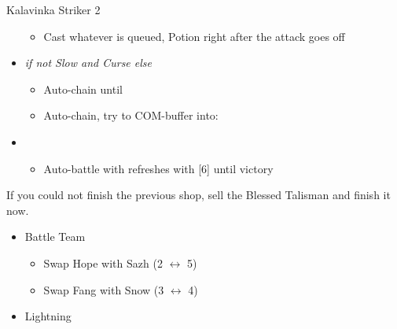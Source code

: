 \begin{multicols}{2}
\begin{battle}[1:28]{Kalavinka Striker 2}
\begin{itemize}
\begin{itemize}
              \item Cast whatever is queued, Potion right after the attack goes off
            \end{itemize}
      \item \second \textit{ if not Slow and Curse else} \fourth
            \begin{itemize}
              \item Auto-chain until \stagger
              \item Auto-chain, try to COM-buffer into:
            \end{itemize}
      \item \fifth
            \begin{itemize}
              \item Auto-battle with refreshes with [6] until victory
            \end{itemize}
    \end{itemize}
  \end{battle}
  If you could not finish the previous shop, sell the Blessed Talisman and finish it now.
  \vfill
  \renewcommand{\first}{[1] Strike Team (\com/\syn/\com)}
  \renewcommand{\second}{[2] Tri-Disaster (\rav/\rav/\rav)}
  \renewcommand{\third}{[3] Tri-Disaster (\rav/\rav/\rav)}
  \renewcommand{\fourth}{[4] Cerberus (\com/\com/\com)}
  \renewcommand{\fifth}{[5] Cerberus (\com/\com/\com)}
  \begin{menu}
    \begin{itemize}
      \paradigm
      \begin{itemize}
        \item Battle Team
              \begin{itemize}
                \item Swap Hope with Sazh (2 $\leftrightarrow$ 5)
                \item Swap Fang with Snow (3 $\leftrightarrow$ 4)
              \end{itemize}
              {\paradigmline[1]{\textit{\com}}{\textit{\syn}}{\textit{(\com)}}}%
              {\paradigmline{(\rav)}{\rav}{\rav}}%
              {\paradigmline{[\rav]}{(\rav)}{(\rav)}}%
              {\paradigmline{\com}{[\com]}{\com}}%
              {\paradigmline{\com}{[\com]}{\com}}
      \end{itemize}
      \crystarium
      \begin{itemize}
        \item Lightning

\end{itemize}
\end{itemize}
\end{menu}
\end{multicols}
